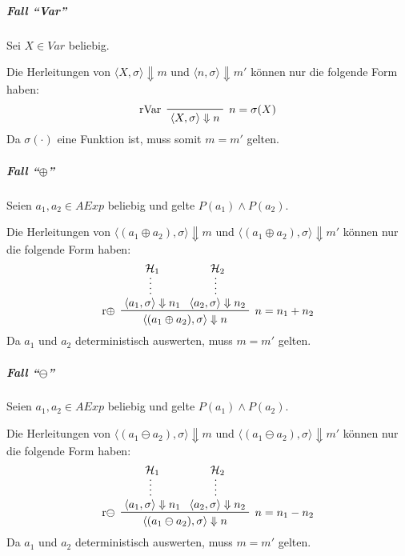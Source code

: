 																\subparagraph{Fall \enquote{Var}}
																	Sei $ X \in \textit{Var} $ beliebig.

																	Die Herleitungen von $ \langle X, \sigma \rangle \Downarrow m $ und $ \langle n, \sigma \rangle \Downarrow m' $ können nur die folgende Form haben:
																	\begin{equation*}
																		\prftree[l, r]
																		{ $ n = \sigma(X) $ }
																		{ rVar }
																		{ \langle X, \sigma \rangle \Downarrow n }
																	\end{equation*}
																	Da $ \sigma(\cdot) $ eine Funktion ist, muss somit $ m = m' $ gelten.

																\subparagraph{Fall \enquote{$ \oplus $}}
																	Seien $ a _ 1, a _ 2 \in \textit{AExp} $ beliebig und gelte $ P(a _ 1) \land P(a _ 2) $.

																	Die Herleitungen von $ \langle (a _ 1 \oplus a _ 2), \sigma \rangle \Downarrow m $ und $ \langle (a _ 1 \oplus a _ 2), \sigma \rangle \Downarrow m' $ können nur die folgende Form haben:
																	\begin{equation*}
																		\prftree[l, r]
																		{ $ n = n _ 1 + n _ 2 $ }
																		{ r$ \oplus $ }
																		{ \prfsummary{\mathcal{H} _ 1}{\langle a _ 1, \sigma \rangle \Downarrow n _ 1} }
																		{ \prfsummary{\mathcal{H} _ 2}{\langle a _ 2, \sigma \rangle \Downarrow n _ 2} }
																		{ \langle (a _ 1 \oplus a _ 2), \sigma \rangle \Downarrow n }
																	\end{equation*}
																	Da $ a _ 1 $ und $ a _ 2 $ deterministisch auswerten, muss $ m = m' $ gelten.

																\subparagraph{Fall \enquote{$ \ominus $}}
																	Seien $ a _ 1, a _ 2 \in \textit{AExp} $ beliebig und gelte $ P(a _ 1) \land P(a _ 2) $.

																	Die Herleitungen von $ \langle (a _ 1 \ominus a _ 2), \sigma \rangle \Downarrow m $ und $ \langle (a _ 1 \ominus a _ 2), \sigma \rangle \Downarrow m' $ können nur die folgende Form haben:
																	\begin{equation*}
																		\prftree[l, r]
																		{ $ n = n _ 1 - n _ 2 $ }
																		{ r$ \ominus $ }
																		{ \prfsummary{\mathcal{H} _ 1}{\langle a _ 1, \sigma \rangle \Downarrow n _ 1} }
																		{ \prfsummary{\mathcal{H} _ 2}{\langle a _ 2, \sigma \rangle \Downarrow n _ 2} }
																		{ \langle (a _ 1 \ominus a _ 2), \sigma \rangle \Downarrow n }
																	\end{equation*}
																	Da $ a _ 1 $ und $ a _ 2 $ deterministisch auswerten, muss $ m = m' $ gelten.


